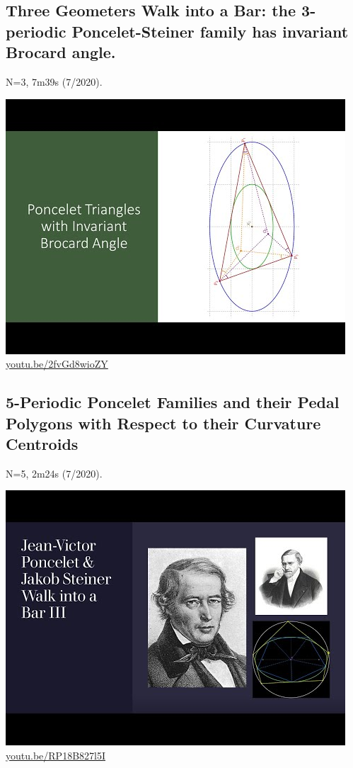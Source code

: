 \documentclass[12pt]{amsart}
\begin{document}
\subsection{Three Geometers Walk into a Bar: the 3-periodic Poncelet-Steiner family has invariant Brocard angle.}
\label{vid:2fvGd8wioZY}
\noindent N=3, 7m39s (7/2020). 
\begin{center}\includegraphics[width=.5\textwidth]{pics/2fvGd8wioZY.jpg} \\ 
\href{https://youtu.be/2fvGd8wioZY}{\url{youtu.be/2fvGd8wioZY}}\end{center}
% 

\subsection{5-Periodic Poncelet Families and their Pedal Polygons with Respect to their Curvature Centroids}
\label{vid:RP18B827l5I}
\noindent N=5, 2m24s (7/2020). 
\begin{center}\includegraphics[width=.5\textwidth]{pics/RP18B827l5I.jpg} \\ 
\href{https://youtu.be/RP18B827l5I}{\url{youtu.be/RP18B827l5I}}\end{center}
% 
\end{document}

